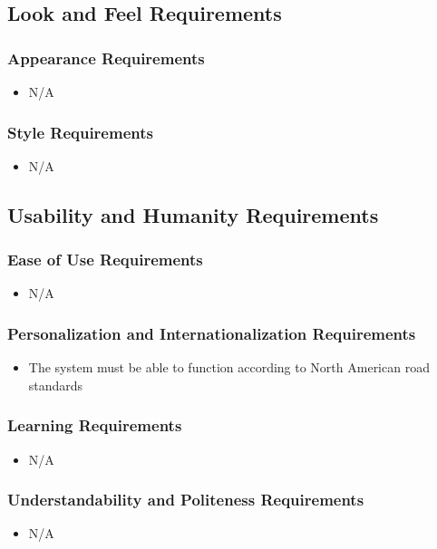 \documentclass [12pt]{article}
\begin{document}
\subsection {Look and Feel Requirements}
\subsubsection{Appearance Requirements}
	\begin{itemize}
		\item N/A
	\end{itemize}

\subsubsection{Style Requirements}
	\begin{itemize}
		\item N/A
	\end{itemize}

\subsection{Usability and Humanity Requirements} 
\subsubsection{Ease of Use Requirements}
	\begin{itemize}
		\item N/A
	\end{itemize}

\subsubsection{Personalization and Internationalization Requirements}
	\begin{itemize}
		\item The system must be able to function according to North American road standards
	\end{itemize}

\subsubsection{Learning Requirements }
	\begin{itemize}
		\item N/A
	\end{itemize}

\subsubsection{Understandability and Politeness Requirements}
	\begin{itemize}
		\item N/A
	\end{itemize}
		
\end{document}
